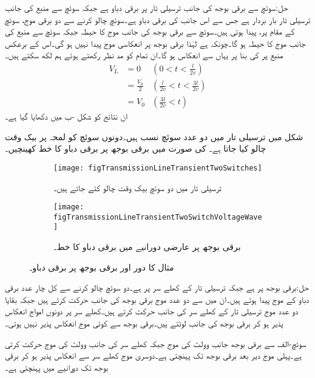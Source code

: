 حل:سوئچ سے برقی بوجھ کی جانب ترسیلی تار پر  برقی دباو ہے جبکہ سوئچ سے منبع کی جانب ترسیلی تار بار بردار ہے جس سے اس جانب کی برقی دباو  ہے۔سوئچ چالو کرنے سے  دو برقی موج، سوئچ کے مقام پر،  پیدا ہوتی ہیں۔سوئچ سے برقی بوجھ  کی جانب موج کا حیطہ  جبکہ سوئچ سے منبع کی جانب موج کا حیطہ  ہو گا۔چونکہ  ہے لہٰذا برقی بوجھ پر انعکاسی موج پیدا نہیں ہو گی۔اس کے برعکس منبع پر  کی بنا پر یہاں سے انعکاس ہو گا۔ان تمام کو مد نظر رکھتے ہوئے ہم لکھ سکتے ہیں۔
\begin{align*}
V_L&=0  &(0<t<\tfrac{l}{2v})\\
&=\frac{V_0}{2} & (\tfrac{l}{2v} < t < \tfrac{3l}{2v})\\
&=V_0 & (\tfrac{3l}{2v} < t  )
\end{align*}
ان نتائج کو شکل -ب میں دکھایا گیا ہے۔

شکل  میں ترسیلی تار میں دو عدد سوئچ نسب ہیں۔دونوں سوئچ کو لمحہ  پر بیک وقت چالو کیا جاتا ہے۔ کی صورت میں برقی بوجھ پر برقی دباو کا خط کھینچیں۔
\begin{figure}
\centering
\begin{subfigure}{0.8\textwidth}
\centering
\texttt{[image: figTransmissionLineTransientTwoSwitches]}
\caption{ترسیلی تار میں دو سوئچ بیک وقت چالو کئے جاتے ہیں۔}
\end{subfigure}

\begin{subfigure}{0.8\textwidth}
\centering
\texttt{[image: figTransmissionLineTransientTwoSwitchVoltageWave]}
\caption{برقی بوجھ پر عارضی دورانیے  میں برقی دباو کا خط۔}
\end{subfigure}
\caption{مثال  کا دور اور برقی بوجھ پر برقی دباو۔}
\label{شکل_ترسیلی_مثال_دو_سوئچ}
\end{figure}

حل:برقی بوجھ پر  ہے جبکہ ترسیلی تار کے کھلے سر پر  ہے۔دو سوئچ چالو کرنے سے کل چار عدد برقی دباو کے موج پیدا ہوتے ہیں۔ان میں سے دو عدد موج برقی بوجھ کی جانب حرکت کرتے ہیں جبکہ بقایا دو عدد موج ترسیلی تار کے کھلے سر کی جانب حرکت کرتے ہیں۔کھلے سر پر دونوں امواج انعکاس پذیر ہو کر برقی بوجھ کی جانب لوٹتے ہیں۔برقی بوجھ سے کوئی موج انعکاس پذیر نہیں ہوتی۔

سوئچ-الف سے  برقی بوجھ جانب  وولٹ کی موج جبکہ کھلے سر کی جانب  وولٹ کی موج حرکت کرتی ہے۔پہلی موج  دیر بعد برقی بوجھ تک پہنچتی ہے۔دوسری موج کھلے سر سے انعکاس پذیر ہو کر برقی بوجھ تک  دورانیے میں پہنچتی ہے۔

